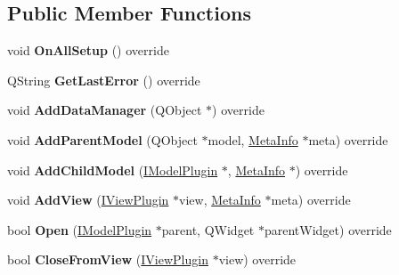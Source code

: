 \subsection*{Public Member Functions}
\begin{DoxyCompactItemize}
\item 
\mbox{\label{class_pomodoro_model_a85c9d12406ed21729f6005dfc908c5cb}} 
void {\bfseries On\+All\+Setup} () override
\item 
\mbox{\label{class_pomodoro_model_a55f5626d19a07eb9a55df33ee85e406d}} 
Q\+String {\bfseries Get\+Last\+Error} () override
\item 
\mbox{\label{class_pomodoro_model_adcd261354a434841efd78680bf20d931}} 
void {\bfseries Add\+Data\+Manager} (Q\+Object $\ast$) override
\item 
\mbox{\label{class_pomodoro_model_a147a7a3a571c687daff22c828707bb0b}} 
void {\bfseries Add\+Parent\+Model} (Q\+Object $\ast$model, \hyperlink{struct_meta_info}{Meta\+Info} $\ast$meta) override
\item 
\mbox{\label{class_pomodoro_model_a3831623175a6c29ce1a8797ffc11c529}} 
void {\bfseries Add\+Child\+Model} (\hyperlink{class_i_model_plugin}{I\+Model\+Plugin} $\ast$, \hyperlink{struct_meta_info}{Meta\+Info} $\ast$) override
\item 
\mbox{\label{class_pomodoro_model_adedad99bab70c118b5261fe3538ef0ee}} 
void {\bfseries Add\+View} (\hyperlink{class_i_view_plugin}{I\+View\+Plugin} $\ast$view, \hyperlink{struct_meta_info}{Meta\+Info} $\ast$meta) override
\item 
\mbox{\label{class_pomodoro_model_abf2546e06f3d433d6e68d2cb49b9f1c2}} 
bool {\bfseries Open} (\hyperlink{class_i_model_plugin}{I\+Model\+Plugin} $\ast$parent, Q\+Widget $\ast$parent\+Widget) override
\item 
\mbox{\label{class_pomodoro_model_ab6e063b77058b39238b6895d9bfd305c}} 
bool {\bfseries Close\+From\+View} (\hyperlink{class_i_view_plugin}{I\+View\+Plugin} $\ast$view) override
\item 

\end{DoxyCompactItemize}
